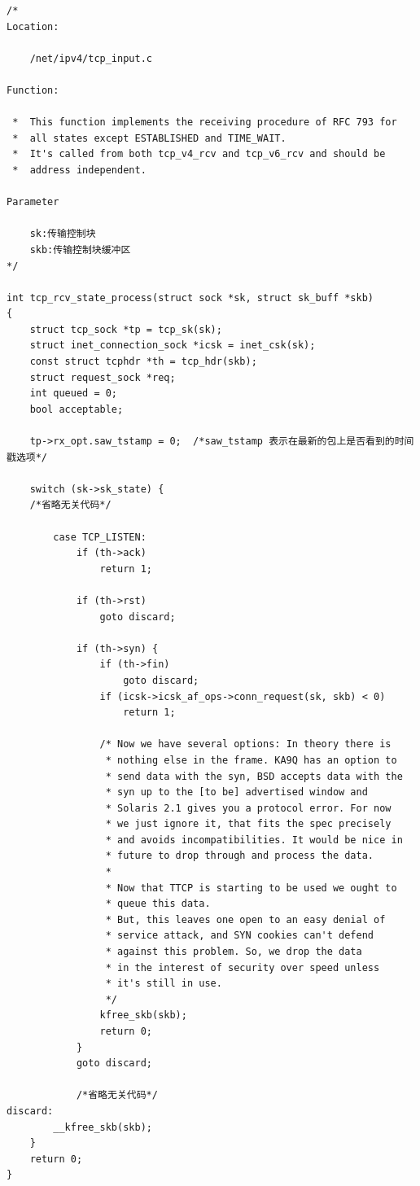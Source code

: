 \begin{verbatim}
/*
Location:
	
	/net/ipv4/tcp_input.c

Function:

 *  This function implements the receiving procedure of RFC 793 for
 *  all states except ESTABLISHED and TIME_WAIT.
 *  It's called from both tcp_v4_rcv and tcp_v6_rcv and should be
 *  address independent.	

Parameter

	sk:传输控制块
	skb:传输控制块缓冲区
*/

int tcp_rcv_state_process(struct sock *sk, struct sk_buff *skb)
{
    struct tcp_sock *tp = tcp_sk(sk);
    struct inet_connection_sock *icsk = inet_csk(sk);
    const struct tcphdr *th = tcp_hdr(skb);
    struct request_sock *req;
    int queued = 0;
    bool acceptable;

    tp->rx_opt.saw_tstamp = 0;  /*saw_tstamp 表示在最新的包上是否看到的时间戳选项*/

    switch (sk->sk_state) {
    /*省略无关代码*/

        case TCP_LISTEN:
            if (th->ack)
                return 1;

            if (th->rst)
                goto discard;

            if (th->syn) {
                if (th->fin)
                    goto discard;
                if (icsk->icsk_af_ops->conn_request(sk, skb) < 0)
                    return 1;

                /* Now we have several options: In theory there is
                 * nothing else in the frame. KA9Q has an option to
                 * send data with the syn, BSD accepts data with the
                 * syn up to the [to be] advertised window and
                 * Solaris 2.1 gives you a protocol error. For now
                 * we just ignore it, that fits the spec precisely
                 * and avoids incompatibilities. It would be nice in
                 * future to drop through and process the data.
                 *
                 * Now that TTCP is starting to be used we ought to
                 * queue this data.
                 * But, this leaves one open to an easy denial of
                 * service attack, and SYN cookies can't defend
                 * against this problem. So, we drop the data
                 * in the interest of security over speed unless
                 * it's still in use.
                 */
                kfree_skb(skb);
                return 0;
            }
            goto discard;

            /*省略无关代码*/
discard:
        __kfree_skb(skb);
    }
    return 0;
}
\end{verbatim}

